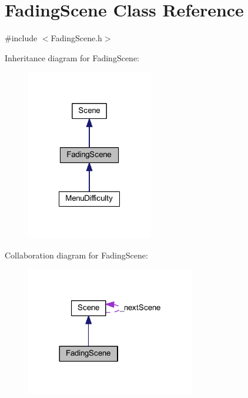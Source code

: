 \hypertarget{class_fading_scene}{
\section{FadingScene Class Reference}
\label{d0/d30/class_fading_scene}
}


{\ttfamily \#include $<$FadingScene.h$>$}



Inheritance diagram for FadingScene:
\nopagebreak
\begin{figure}[H]
\begin{center}
\leavevmode
\includegraphics[width=156pt]{d9/d0a/class_fading_scene__inherit__graph}
\end{center}
\end{figure}


Collaboration diagram for FadingScene:
\nopagebreak
\begin{figure}[H]
\begin{center}
\leavevmode
\includegraphics[width=209pt]{d2/d75/class_fading_scene__coll__graph}
\end{center}
\end{figure}
